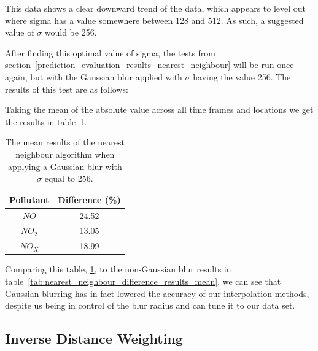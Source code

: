 
			This data shows a clear downward trend of the data, which appears to level out where sigma has a value somewhere between 128 and 512. As such, a suggested value of $\sigma$ would be 256. 

			After finding this optimal value of sigma, the tests from section~\ref{prediction_evaluation_results_nearest_neighbour} will be run once again, but with the Gaussian blur applied with $\sigma$ having the value 256. The results of this test are as follows:


			Taking the mean of the absolute value across all time frames and locations we get the results in table~\ref{tab:nearest_neighbour_convolution_results}.

			\begin{table}
				\centering
	    		\begin{tabular}{|c|c|}
	    			\hline
					Pollutant & Difference (\%) \\ \hline
					$NO$ & 24.52 \\
					$NO_{2}$ & 13.05 \\
					$NO_{X}$ & 18.99 \\
					\hline 
				\end{tabular}
				\caption{The mean results of the nearest neighbour algorithm when applying a Gaussian blur with $\sigma$ equal to 256.}
				\label{tab:nearest_neighbour_convolution_results}
			\end{table}

			Comparing this table, \ref{tab:nearest_neighbour_convolution_results}, to the non-Gaussian blur results in table~\ref{tab:nearest_neighbour_difference_results_mean}, we can see that Gaussian blurring has in fact lowered the accuracy of our interpolation methods, despite us being in control of the blur radius and can tune it to our data set. 

        \subsection{Inverse Distance Weighting}\label{prediction_evaluation_results_inverse_distance_weighting}

